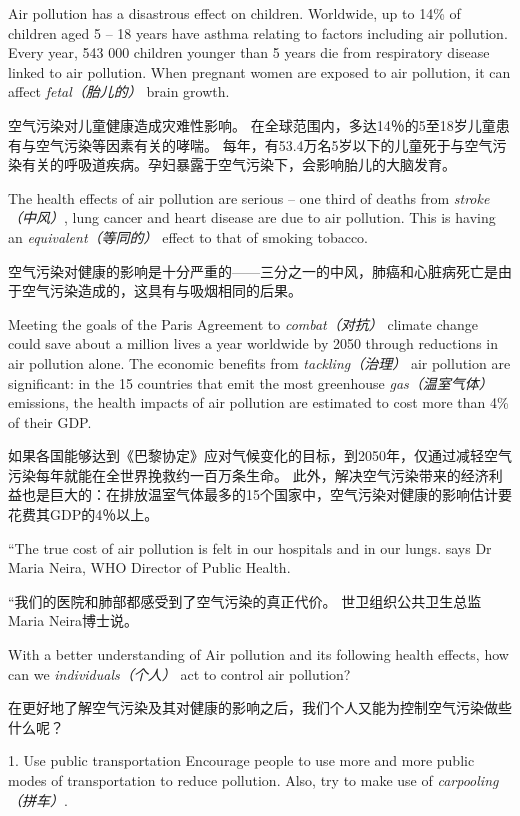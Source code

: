\begin{multicols}{3}
Air pollution has a disastrous effect on children. Worldwide, up to 14\% of children aged 5 – 18 years have asthma relating to factors including air pollution. Every year, 543 000 children younger than 5 years die from respiratory disease linked to air pollution. When pregnant women are exposed to air pollution, it can affect \textit{fetal（胎儿的）} brain growth.

空气污染对儿童健康造成灾难性影响。 在全球范围内，多达14％的5至18岁儿童患有与空气污染等因素有关的哮喘。 每年，有53.4万名5岁以下的儿童死于与空气污染有关的呼吸道疾病。孕妇暴露于空气污染下，会影响胎儿的大脑发育。

The health effects of air pollution are serious – one third of deaths from \textit{stroke（中风）}, lung cancer and heart disease are due to air pollution. This is having an \textit{equivalent（等同的）} effect to that of smoking tobacco.

空气污染对健康的影响是十分严重的——三分之一的中风，肺癌和心脏病死亡是由于空气污染造成的，这具有与吸烟相同的后果。

Meeting the goals of the Paris Agreement to \textit{combat（对抗）} climate change could save about a million lives a year worldwide by 2050 through reductions in air pollution alone. The economic benefits from \textit{tackling（治理）} air pollution are significant: in the 15 countries that emit the most greenhouse \textit{gas（温室气体）} emissions, the health impacts of air pollution are estimated to cost more than 4\% of their GDP.

如果各国能够达到《巴黎协定》应对气候变化的目标，到2050年，仅通过减轻空气污染每年就能在全世界挽救约一百万条生命。 此外，解决空气污染带来的经济利益也是巨大的：在排放温室气体最多的15个国家中，空气污染对健康的影响估计要花费其GDP的4％以上。

“The true cost of air pollution is felt in our hospitals and in our lungs.  says Dr Maria Neira, WHO Director of Public Health.

“我们的医院和肺部都感受到了空气污染的真正代价。 世卫组织公共卫生总监Maria Neira博士说。

With a better understanding of Air pollution and its following health effects, how can we \textit{individuals（个人）} act to control air pollution?

在更好地了解空气污染及其对健康的影响之后，我们个人又能为控制空气污染做些什么呢？

1. Use public transportation
Encourage people to use more and more public modes of transportation to reduce pollution. Also, try to make use of \textit{carpooling（拼车）}.


\end{multicols}
